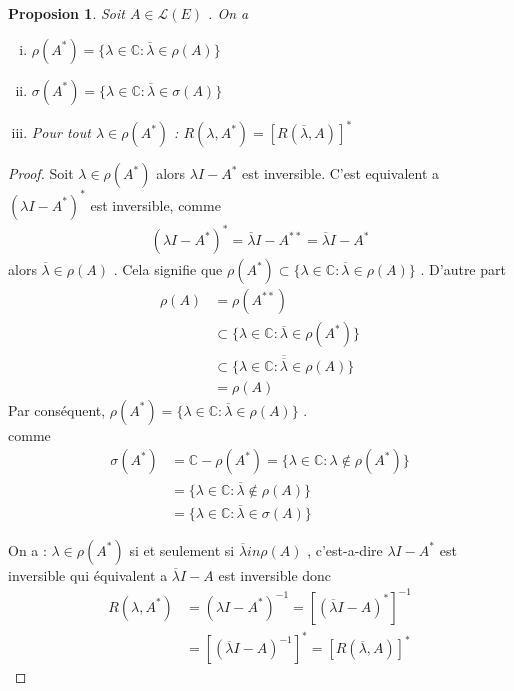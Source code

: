 \documentclass{report}
\newtheorem{Prop}{Proposion}[subsection]
\begin{document}
{\begin{Prop} Soit $A \in \mathscr{L}(E)$ . On a 
	\begin{enumerate}[i)]
	\item    $\rho(A^*) = \{\lambda \in \mathbb{C} : \overline{\lambda} \in \rho(A)\}$ 
	\item   $\sigma(A^*) = \{\lambda \in \mathbb{C} : \overline{\lambda} \in \sigma(A)\}$ 
	\item  Pour tout $\lambda \in \rho(A^*)$ : $R(\lambda, A^*) = [R(\overline{\lambda}, A)]^*$  
\end{enumerate}
\end{Prop}
\begin{proof}
   Soit $\lambda \in \rho(A^*)$ alors $\lambda I - A^*$ est inversible. C'est equivalent a $(\lambda I - A^*)^*$ est inversible, comme 
					\begin{align*}
					 (\lambda I - A^*)^* = \overline{\lambda} I - A^{**} = \overline{\lambda} I - A^* 
					\end{align*}
	alors $\overline{\lambda} \in \rho(A)$ . Cela signifie que $\rho(A^*) \subset \{\lambda \in \mathbb{C} : \overline{\lambda} \in \rho(A) \}$ . D'autre part 
					\begin{align*}
					 \rho(A) &= \rho(A^{**}) \\
					 &\subset \{\lambda \in \mathbb{C} : \overline{\lambda} \in \rho(A^*) \} \\
					 &\subset \{\lambda \in \mathbb{C} : \overline{\overline{\lambda}} \in \rho(A) \} \\
					 &= \rho(A) 
					\end{align*}
	Par conséquent, $\rho(A^*) = \{\lambda \in \mathbb{C} : \overline{\lambda} \in \rho(A)\}$ .\\

  comme 
					\begin{align*}
					 \sigma(A^*) &= \mathbb{C} - \rho(A^*) = \{\lambda \in \mathbb{C} : \lambda \notin \rho(A^*)\} \\
					 &= \{\lambda \in \mathbb{C} : \overline{\lambda} \notin \rho(A) \} \\
					 &= \{\lambda \in \mathbb{C} : \overline{\lambda} \in \sigma(A) \} 
					\end{align*}

 On a : $\lambda \in \rho(A^*)$ si et seulement si $\overline{\lambda} in \rho(A)$ , c'est-a-dire $\lambda I - A^*$ est inversible qui équivalent a $\overline{\lambda} I - A$ est inversible donc 
					\begin{align*}
					 R(\lambda, A^*) & = (\lambda I - A^*)^{-1} = [(\overline{\lambda} I - A)^*]^{-1} \\
					 &= [(\overline{\lambda} I - A)^{-1}]^* = [R(\overline{\lambda},A)]^* 
					\end{align*}
\end{proof}



}
\end{document}

